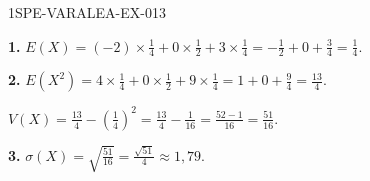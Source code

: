 \begin{corrige}{1SPE-VARALEA-EX-013}

\textbf{1.} $E(X) = (-2) \times \frac{1}{4} + 0 \times \frac{1}{2} + 3 \times \frac{1}{4} = -\frac{1}{2} + 0 + \frac{3}{4} = \frac{1}{4}$.

\medskip
\textbf{2.} $E(X^2) = 4 \times \frac{1}{4} + 0 \times \frac{1}{2} + 9 \times \frac{1}{4} = 1 + 0 + \frac{9}{4} = \frac{13}{4}$.

$V(X) = \frac{13}{4} - \left(\frac{1}{4}\right)^2 = \frac{13}{4} - \frac{1}{16} = \frac{52-1}{16} = \frac{51}{16}$.

\medskip
\textbf{3.} $\sigma(X) = \sqrt{\frac{51}{16}} = \frac{\sqrt{51}}{4} \approx 1{,}79$.

\end{corrige}
